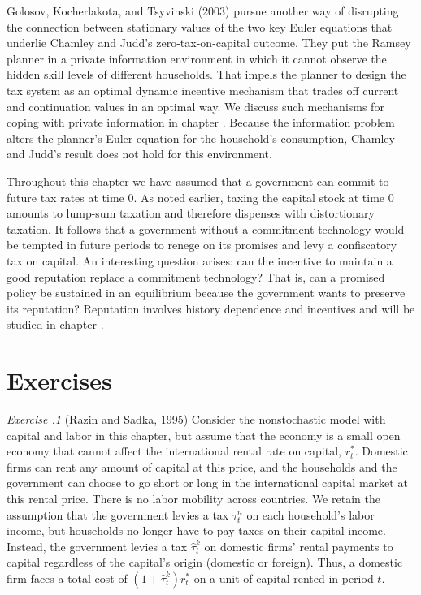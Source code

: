 Golosov, Kocherlakota,  and Tsyvinski  (2003) pursue another way
of disrupting the connection between stationary values of the two
key Euler equations that underlie Chamley and Judd's
zero-tax-on-capital outcome.  They put the Ramsey planner in a
private information environment in which it cannot observe the
hidden skill levels of  different households.  That impels the
planner to
design the tax system as an optimal dynamic
incentive mechanism that trades off current and continuation
values in an optimal way. We discuss such mechanisms for coping
with private information in chapter
. Because the information problem alters the
planner's Euler equation for the household's consumption, Chamley
and Judd's result does not hold for this environment.

Throughout this chapter we have assumed that a government can commit to future tax rates  at time 0. As noted earlier,
taxing the capital stock at time 0 amounts to lump-sum
taxation and therefore dispenses with
distortionary taxation. It follows that
a government without a commitment technology would be tempted
in future periods to renege on its promises and levy a
confiscatory tax on capital. An interesting question arises:
 can the incentive to maintain a good reputation replace
a commitment
technology? That is, can a  promised policy be sustained in
an equilibrium because the government  wants to preserve its
reputation? Reputation involves history dependence and incentives and
will be studied in chapter .



\showchaptIDfalse
\showsectIDfalse
\section{Exercises}
\showchaptIDtrue
\showsectIDtrue
\noindent
{\it Exercise \the\chapternum.1} 
(Razin and Sadka, 1995)
\medskip
\noindent
Consider the nonstochastic model with capital and labor in this
chapter, but assume that
the economy is a small open economy that cannot affect the
international rental rate on capital, $r^*_t$.
Domestic firms can rent any amount of capital at this price, and
the households and the government can choose to go short or long in
the international capital market at this rental price. There is
no labor mobility across countries.
We retain the assumption that the government levies a tax $\tau^n_t$ on
each household's labor income, but households no longer have
to pay taxes on their capital income. Instead, the
government levies a tax $\hat \tau^k_t$ on domestic firms' rental
payments to capital regardless of the capital's origin (domestic
or foreign). Thus, a
domestic firm faces a total cost of $(1+\hat \tau^k_t)r^*_t$ on a
unit of capital rented in period $t$.

